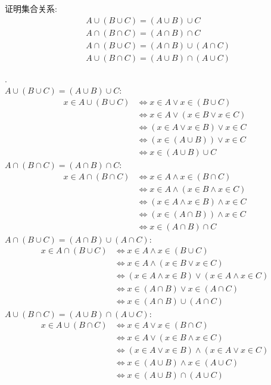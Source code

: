 \begin{exercise}
证明集合关系:
\begin{align*}
    &A\cup (B\cup C)=(A\cup B)\cup C\\
    &A\cap (B\cap C)=(A\cap B)\cap C\\
    &A\cap (B\cup C)=(A\cap B)\cup (A\cap C)\\
    &A\cup (B\cap C)=(A\cup B)\cap (A\cup C)
\end{align*}
\end{exercise}
\begin{solution}.\\
$A\cup (B\cup C)=(A\cup B)\cup C$:
\begin{align*}
    x \in A\cup (B\cup C)&\Leftrightarrow x\in A\lor x\in (B\cup C)\\
    &\Leftrightarrow x\in A\lor (x\in B\lor x\in C)\\
    &\Leftrightarrow  (x\in A\lor x\in B)\lor x\in C\\
    &\Leftrightarrow (x\in (A\cup B))\lor x\in C\\
    &\Leftrightarrow x\in (A\cup B)\cup C
\end{align*}
$A\cap (B\cap C)=(A\cap B)\cap C$:
\begin{align*}
    x \in A\cap (B\cap C)&\Leftrightarrow x\in A\land x\in (B\cap C)\\
    &\Leftrightarrow x\in A\land (x\in B\land x\in C)\\
    &\Leftrightarrow  (x\in A\land x\in B)\land x\in C\\
    &\Leftrightarrow (x\in (A\cap B))\land x\in C\\
    &\Leftrightarrow x\in (A\cap B)\cap C
\end{align*}
$A\cap (B\cup C)=(A\cap B)\cup (A\cap C)$:
\begin{align*}
    x\in A\cap (B\cup C)&\Leftrightarrow x\in A \land x\in (B\cup C)\\
    &\Leftrightarrow x\in A\land (x\in B\lor x\in C)\\
    &\Leftrightarrow (x\in A\land x\in B)\lor (x\in A\land x\in C)\\
    &\Leftrightarrow x\in (A\cap B)\lor x\in (A\cap C)\\
    &\Leftrightarrow x\in (A\cap B)\cup (A\cap C)
\end{align*}
$A\cup (B\cap C)=(A\cup B)\cap (A\cup C)$:
\begin{align*}
    x\in A\cup (B\cap C)&\Leftrightarrow x\in A \lor x\in (B\cap C)\\
    &\Leftrightarrow x\in A\lor (x\in B\land x\in C)\\
    &\Leftrightarrow (x\in A\lor x\in B)\land (x\in A\lor x\in C)\\
    &\Leftrightarrow x\in (A\cup B)\land x\in (A\cup C)\\
    &\Leftrightarrow x\in (A\cup B)\cap (A\cup C)
\end{align*}
\end{solution}

